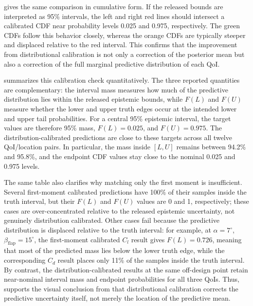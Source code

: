 \documentclass[a4paper,12pt]{article}
\begin{document}
 gives the same comparison in cumulative form. If the released bounds are interpreted as 95\% intervals, the left and right red lines should intersect a calibrated CDF near probability levels 0.025 and 0.975, respectively. The green CDFs follow this behavior closely, whereas the orange CDFs are typically steeper and displaced relative to the red interval. This confirms that the improvement from distributional calibration is not only a correction of the posterior mean but also a correction of the full marginal predictive distribution of each QoI.

 summarizes this calibration check quantitatively. The three reported quantities are complementary: the interval mass measures how much of the predictive distribution lies within the released epistemic bounds, while $F(L)$ and $F(U)$ measure whether the lower and upper truth edges occur at the intended lower and upper tail probabilities. For a central 95\% epistemic interval, the target values are therefore 95\% mass, $F(L)=0.025$, and $F(U)=0.975$. The distribution-calibrated predictions are close to these targets across all twelve QoI/location pairs. In particular, the mass inside $[L,U]$ remains between 94.2\% and 95.8\%, and the endpoint CDF values stay close to the nominal 0.025 and 0.975 levels.

The same table also clarifies why matching only the first moment is insufficient. Several first-moment calibrated predictions have 100\% of their samples inside the truth interval, but their $F(L)$ and $F(U)$ values are 0 and 1, respectively; these cases are over-concentrated relative to the released epistemic uncertainty, not genuinely distribution calibrated. Other cases fail because the predictive distribution is displaced relative to the truth interval: for example, at $\alpha=7^\circ$, $\beta_{\mathrm{flap}}=15^\circ$, the first-moment calibrated $C_l$ result gives $F(L)=0.726$, meaning that most of the predicted mass lies below the lower truth edge, while the corresponding $C_d$ result places only 11\% of the samples inside the truth interval. By contrast, the distribution-calibrated results at the same off-design point retain near-nominal interval mass and endpoint probabilities for all three QoIs. Thus,  supports the visual conclusion from  that distributional calibration corrects the predictive uncertainty itself, not merely the location of the predictive mean.
\end{document}
